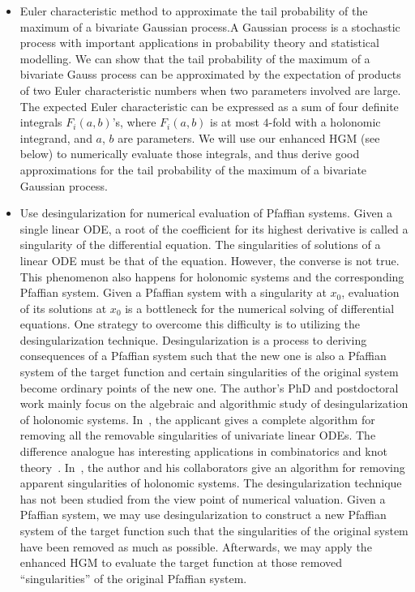 \documentclass[10pt,a4paper]{article}
\begin{document}
\begin{itemize}
\item Euler characteristic method to approximate the tail probability of the maximum of a bivariate Gaussian process.A Gaussian process is a stochastic process with important applications in probability theory and statistical modelling. We can show that the tail probability of the maximum of a bivariate Gauss process can be approximated by the expectation of products of two Euler characteristic numbers when two parameters involved are large. The expected Euler characteristic can be expressed as a sum of four definite integrals $F_i(a, b)$’s, where $F_i(a, b)$ is at most $4$-fold with a holonomic integrand, and $a$, $b$ are parameters. We will use our enhanced HGM (see below) to numerically evaluate those integrals, and thus derive good approximations for the tail probability of the maximum of a bivariate Gaussian process.

\item Use desingularization for numerical evaluation of Pfaffian systems. Given a single linear ODE, a root of the coefficient for its highest derivative is called a singularity of the differential equation. The singularities of solutions of a linear ODE must be that of the equation. However, the converse is not true. This phenomenon also happens for holonomic systems and the corresponding Pfaffian system. Given a Pfaffian system with a singularity at $x_0$, evaluation of its solutions at $x_0$ is a bottleneck for the numerical solving of differential equations. One strategy to overcome this difficulty is to utilizing the desingularization technique. Desingularization is a process to deriving consequences of a Pfaffian system such that the new one is also a Pfaffian system of the target function and certain singularities of the original system become ordinary points of the new one. The author’s PhD and postdoctoral work mainly focus on the algebraic and algorithmic study of desingularization of holonomic systems. In~\cite{Zhang2016}, the applicant gives a complete algorithm for removing all the removable singularities of univariate linear ODEs. The difference analogue has interesting applications in combinatorics and knot theory~\cite{KZ2018}. In~\cite{Yi2017}, the author and his collaborators give an algorithm for removing apparent singularities of holonomic systems. The desingularization technique has not been studied from the view point of numerical valuation. Given a Pfaffian system, we may use desingularization to construct a new Pfaffian system of the target function such that the singularities of the original system have been removed as much as possible. Afterwards, we may apply the enhanced HGM to evaluate the target function at those removed “singularities” of the original Pfaffian system.


\end{itemize}
\end{document}
